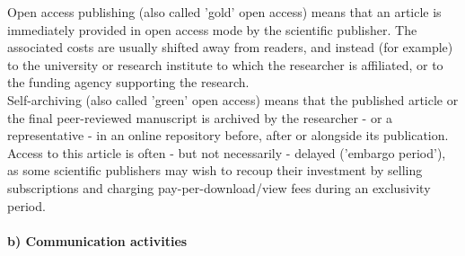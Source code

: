 {\begin{compactitem}
%
    Open access publishing (also called 'gold' open access) means that an
    article is immediately provided in open access mode by the scientific
    publisher. The associated costs are usually shifted away from readers, and
    instead (for example) to the university or research institute to which the
    researcher is affiliated, or to the funding agency supporting the research.\\
%
    Self-archiving (also called 'green' open access) means that the published
    article or the final peer-reviewed manuscript is archived by the researcher
    - or a representative - in an online repository before, after or alongside
    its publication.  Access to this article is often - but not necessarily -
    delayed ('embargo period'), as some scientific publishers may wish to recoup
    their investment by selling subscriptions and charging pay-per-download/view
    fees during an exclusivity period.
%
  \end{compactitem}
}

\paragraph{b) Communication activities}


